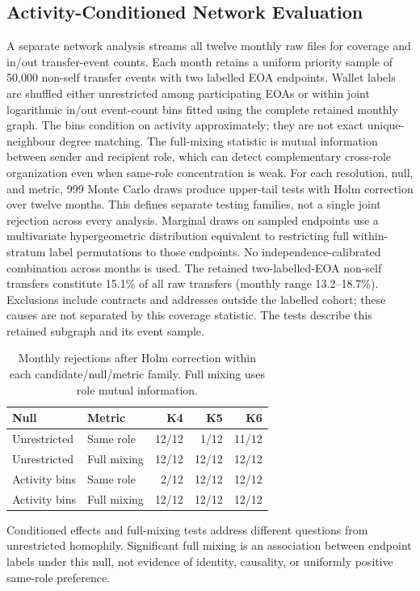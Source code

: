 \subsection{Activity-Conditioned Network Evaluation}
A separate network analysis streams all twelve monthly raw files for coverage and in/out transfer-event counts. Each month retains a uniform priority sample of 50,000 non-self transfer events with two labelled EOA endpoints. Wallet labels are shuffled either unrestricted among participating EOAs or within joint logarithmic in/out event-count bins fitted using the complete retained monthly graph. The bins condition on activity approximately; they are not exact unique-neighbour degree matching. The full-mixing statistic is mutual information between sender and recipient role, which can detect complementary cross-role organization even when same-role concentration is weak.
For each resolution, null, and metric, 999 Monte Carlo draws produce upper-tail tests with Holm correction over twelve months. This defines separate testing families, not a single joint rejection across every analysis. Marginal draws on sampled endpoints use a multivariate hypergeometric distribution equivalent to restricting full within-stratum label permutations to those endpoints. No independence-calibrated combination across months is used.
The retained two-labelled-EOA non-self transfers constitute 15.1\% of all raw transfers (monthly range 13.2--18.7\%). Exclusions include contracts and addresses outside the labelled cohort; these causes are not separated by this coverage statistic. The tests describe this retained subgraph and its event sample.
\begin{table}[t]\centering\caption{Monthly rejections after Holm correction within each candidate/null/metric family. Full mixing uses role mutual information.}\small
\begin{tabular}{llrrr}\toprule Null & Metric & K4 & K5 & K6 \\\midrule
Unrestricted & Same role & 12/12 & 1/12 & 11/12 \\
Unrestricted & Full mixing & 12/12 & 12/12 & 12/12 \\
Activity bins & Same role & 2/12 & 12/12 & 12/12 \\
Activity bins & Full mixing & 12/12 & 12/12 & 12/12 \\
\bottomrule\end{tabular}\end{table}
Conditioned effects and full-mixing tests address different questions from unrestricted homophily. Significant full mixing is an association between endpoint labels under this null, not evidence of identity, causality, or uniformly positive same-role preference.
